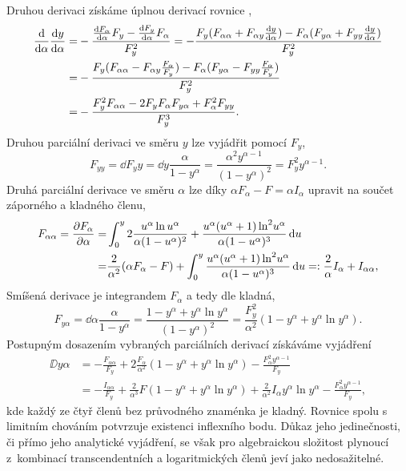 Druhou derivaci získáme úplnou derivací rovnice ,
\begin{align}\label{eq:implicit_second_derivative}
    \frac{\mathrm{d} }{\mathrm{d} \alpha}\frac{\mathrm{d} y}{\mathrm{d} \alpha}=&-\frac{\frac{\mathrm{d} F_\alpha}{\mathrm{d} \alpha}F_y-\frac{\mathrm{d} F_y}{\mathrm{d} \alpha}F_\alpha}{F_y^2}=-\frac{F_y(F_{\alpha\alpha}+F_{\alpha y}\frac{\mathrm{d} y}{\mathrm{d} \alpha})-F_\alpha(F_{y\alpha}+F_{yy}\frac{\mathrm{d} y}{\mathrm{d} \alpha})}{F_y^2}
    \nonumber \\ 
    =&-\frac{F_y(F_{\alpha\alpha}-F_{\alpha y}\frac{F_\alpha}{F_y})-F_\alpha(F_{y\alpha}-F_{yy}\frac{F_\alpha}{F_y})}{F_y^2}
    \nonumber \\
    =&-\frac{F_y^2 F_{\alpha\alpha}-2F_yF_\alpha F_{y\alpha}+F_\alpha^2F_{yy}}{F_y^3}.
\end{align}
Druhou parciální derivaci ve směru $y$ lze vyjádřit pomocí $F_y$,
\begin{equation}
    F_{yy}=\dd{F_y}{y}=\dd{}{y}\frac{\alpha}{1-y^\alpha}=\frac{\alpha^2 y^{\alpha-1}}{(1-y^\alpha)^2}=F_y^2 y^{\alpha-1}.
\end{equation}
Druhá parciální derivace ve směru $\alpha$ lze díky $\alpha F_\alpha-F=\alpha I_\alpha$ upravit na součet záporného a kladného členu,
\begin{align}
    F_{\alpha\alpha}=\frac{\partial F_\alpha}{\partial \alpha}=&\int_0^y 2\frac{u^\alpha \ln{u^\alpha}}{\alpha(1-u^\alpha)^2}+\frac{u^\alpha(u^\alpha+1)\ln^2{\!u^\alpha}}{\alpha(1-u^\alpha)^3}\,\mathrm{d}{u}\\
    =&\frac{2}{\alpha^2}(\alpha F_\alpha-F)+\int_0^y \frac{u^\alpha(u^\alpha+1)\ln^2{\!u^\alpha}}{\alpha(1-u^\alpha)^3}\,\mathrm{d}{u}=:\frac{2}{\alpha}I_\alpha+I_{\alpha\alpha},
\end{align}
Smíšená derivace je integrandem $F_\alpha$ a tedy dle  kladná,
\begin{equation}
    F_{y\alpha}=\dd{}{\alpha}\frac{\alpha}{1-y^\alpha}=\frac{1-y^\alpha+y^\alpha\ln{y^\alpha}}{(1-y^\alpha)^2}=\frac{F_y^2}{\alpha^2}\left(1-y^\alpha +y^\alpha \ln{y^\alpha}\right).
\end{equation}
Postupným dosazením vybraných parciálních derivací získáváme vyjádření
\begin{subequations}
    \begin{align}
        \DD{y}{\alpha}&=-\frac{F_{\alpha\alpha}}{F_y}+2\frac{F_\alpha}{\alpha^2}\left(1-y^\alpha+y^\alpha\ln y^\alpha\right)-\frac{F_\alpha^2y^{\alpha-1}}{F_y}\\
        &=-\frac{I_{\alpha\alpha}}{F_y}+\frac{2}{\alpha^3}F\left(1-y^\alpha+y^\alpha\ln y^\alpha\right)+\frac{2}{\alpha^2}I_\alpha y^\alpha\ln y^\alpha-\frac{F_\alpha^2y^{\alpha-1}}{F_y},
    \end{align}\label{eq:second_derivative_positive_negative}
\end{subequations}
kde každý ze čtyř členů bez průvodného znaménka je kladný. Rovnice  spolu s limitním chováním potvrzuje existenci inflexního bodu. Důkaz jeho jedinečnosti, či přímo jeho analytické vyjádření, se však pro algebraickou složitost plynoucí z~kombinací transcendentních a logaritmických členů jeví jako nedosažitelné. 

